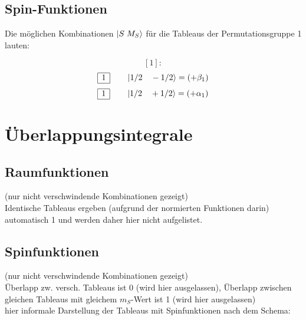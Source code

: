 \documentclass[fleqn]{article}%
\newcommand{\checkpagebreak}{\needspace{.25\textheight}}%
\begin{document}
\subsection{Spin{-}Funktionen}%
\label{subsec:Spin{-}Funktionen}%
Die möglichen Kombinationen $\ket{S \; M_S}$ für die Tableaus der Permutationsgruppe 1 lauten:

%
\vspace{0.25cm}%
\begin{dmath*}\left[1\right]:\end{dmath*}%
\vspace{0.25cm}%
\begin{dmath*}\begin{array}{|c|} \hline 1\\ \cline{1-1} \end{array} \qquad \ket{ 1/2 \quad  -1/2 } = \left( + \beta_{1}\right) \end{dmath*}%
\vspace{0.25cm}%
\begin{dmath*}\begin{array}{|c|} \hline 1\\ \cline{1-1} \end{array} \qquad \ket{ 1/2 \quad  +1/2 } = \left( + \alpha_{1}\right) \end{dmath*}%
\vspace{0.25cm}%
\vspace{0.25cm}%
\newpage%
\section{Überlappungsintegrale}%
\label{sec:berlappungsintegrale}%

%
\subsection{Raumfunktionen}%
\label{subsec:Raumfunktionen}%
 (nur nicht verschwindende Kombinationen gezeigt)\\Identische Tableaus ergeben (aufgrund der normierten Funktionen darin) automatisch 1 und werden daher hier nicht aufgelistet.

%
\checkpagebreak%
\subsection{Spinfunktionen}%
\label{subsec:Spinfunktionen}%
(nur nicht verschwindende Kombinationen gezeigt)\\ Überlapp zw. versch. Tableaus ist 0 (wird hier ausgelassen), Überlapp zwischen gleichen Tableaus mit gleichem $m_S$-Wert ist 1 (wird hier ausgelassen)\\hier informale Darstellung der Tableaus mit Spinfunktionen nach dem Schema: 
\end{document}
